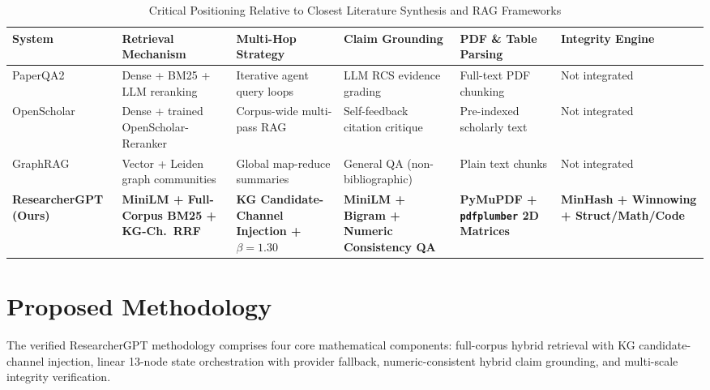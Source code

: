 \documentclass[conference]{IEEEtran}
\begin{document}
\begin{table}[t]
\centering
\caption{Critical Positioning Relative to Closest Literature Synthesis and RAG Frameworks}
\label{tab:related_comparison}
\footnotesize
\setlength{\tabcolsep}{4pt}
\begin{tabular}{p{2.3cm}p{2.7cm}p{2.6cm}p{2.6cm}p{2.5cm}p{2.4cm}}
\toprule
\textbf{System} & \textbf{Retrieval Mechanism} & \textbf{Multi-Hop Strategy} & \textbf{Claim Grounding} & \textbf{PDF \& Table Parsing} & \textbf{Integrity Engine} \\
\midrule
PaperQA2~\cite{skarlinski2024paperqa2} & Dense + BM25 + LLM reranking & Iterative agent query loops & LLM RCS evidence grading & Full-text PDF chunking & Not integrated \\
OpenScholar~\cite{asai2024openscholar} & Dense + trained OpenScholar-Reranker & Corpus-wide multi-pass RAG & Self-feedback citation critique & Pre-indexed scholarly text & Not integrated \\
GraphRAG~\cite{edge2024graphrag} & Vector + Leiden graph communities & Global map-reduce summaries & General QA (non-bibliographic) & Plain text chunks & Not integrated \\
\textbf{ResearcherGPT (Ours)} & \textbf{MiniLM + Full-Corpus BM25 + KG-Ch.\ RRF} & \textbf{KG Candidate-Channel Injection + $\beta{=}1.30$} & \textbf{MiniLM + Bigram + Numeric Consistency QA} & \textbf{PyMuPDF + \texttt{pdfplumber} 2D Matrices} & \textbf{MinHash + Winnowing + Struct/Math/Code} \\
\bottomrule
\end{tabular}
\end{table}

\section{Proposed Methodology}
The verified ResearcherGPT methodology comprises four core mathematical components: full-corpus hybrid retrieval with KG candidate-channel injection, linear 13-node state orchestration with provider fallback, numeric-consistent hybrid claim grounding, and multi-scale integrity verification.
\end{document}
